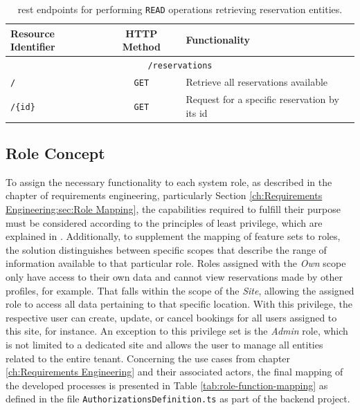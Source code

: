 \begingroup
\setlength{\tabcolsep}{10pt} %
\renewcommand{\arraystretch}{1.5} %
\begin{table}[h]
\centering
\caption{\acrshort{rest} endpoints for performing \texttt{READ} operations retrieving reservation entities.}
    \begin{tabular}{l|c|m{5cm}}
    Resource Identifier & HTTP Method & Functionality \\ \hline
    \multicolumn{3}{c}{\texttt{/reservations}} \\ \hline
    \texttt{/} & \texttt{GET} & Retrieve all reservations available \\
    \texttt{/\{id\}} & \texttt{GET} & Request for a specific reservation by its \acrshort{id} \\
    \end{tabular}
\label{tab:read-reservations-rest}
\end{table}
\endgroup

\subsection{Role Concept}
\label{ch:Implementation:sec:Reservation System:ssec:Role Concept}

To assign the necessary functionality to each system role, as described in the chapter of requirements engineering, particularly  Section \ref{ch:Requirements Engineering:sec:Role Mapping}, the capabilities required to fulfill their purpose must be considered according to the principles of least privilege, which are explained in \cite{ma_specifying_2011}.
Additionally, to supplement the mapping of feature sets to roles, the solution distinguishes between specific scopes that describe the range of information available to that particular role.
Roles assigned with the \textit{Own} scope only have access to their own data and cannot view reservations made by other profiles, for example.
That falls within the scope of the \textit{Site}, allowing the assigned role to access all data pertaining to that specific location.
With this privilege, the respective user can create, update, or cancel bookings for all users assigned to this site, for instance. An exception to this privilege set is the \textit{Admin} role, which is not limited to a dedicated site and allows the user to manage all entities related to the entire tenant. 
Concerning the use cases from chapter \ref{ch:Requirements Engineering} and their associated actors, the final mapping of the developed processes is presented in Table \ref{tab:role-function-mapping} as defined in the file \texttt{AuthorizationsDefinition.ts} as part of the backend project.

